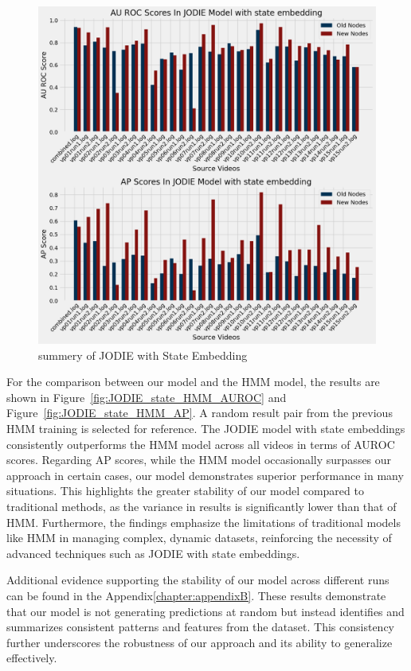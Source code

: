 \begin{figure}[h]
    \centering
    \includegraphics[width=\textwidth]{figures/05_JODIE_with_state.png}
    \caption{summery of JODIE with State Embedding}
    \label{fig:JODIE_state_embedding_results}
\end{figure}

\clearpage

For the comparison between our model and the HMM model, the results are shown in Figure~\ref{fig:JODIE_state_HMM_AUROC} and Figure~\ref{fig:JODIE_state_HMM_AP}. A random result pair from the previous HMM training is selected for reference. The JODIE model with state embeddings consistently outperforms the HMM model across all videos in terms of AUROC scores. Regarding AP scores, while the HMM model occasionally surpasses our approach in certain cases, our model demonstrates superior performance in many situations. This highlights the greater stability of our model compared to traditional methods, as the variance in results is significantly lower than that of HMM. Furthermore, the findings emphasize the limitations of traditional models like HMM in managing complex, dynamic datasets, reinforcing the necessity of advanced techniques such as JODIE with state embeddings.

Additional evidence supporting the stability of our model across different runs can be found in the Appendix\ref{chapter:appendixB}. These results demonstrate that our model is not generating predictions at random but instead identifies and summarizes consistent patterns and features from the dataset. This consistency further underscores the robustness of our approach and its ability to generalize effectively.

